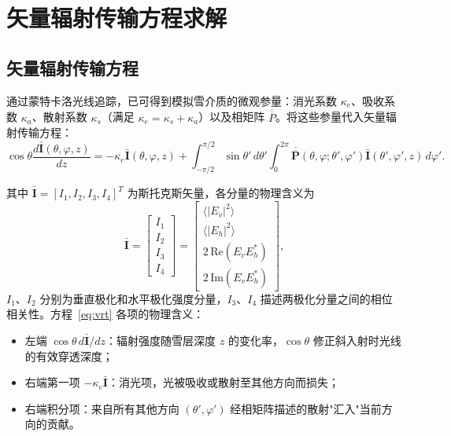 \documentclass[UTF8,a4paper,12pt]{ctexart}
\begin{document}
\section{矢量辐射传输方程求解}
\label{sec:vrt}

\subsection{矢量辐射传输方程}

通过蒙特卡洛光线追踪，已可得到模拟雪介质的微观参量：消光系数 $\kappa_e$、吸收系数 $\kappa_a$、散射系数 $\kappa_s$（满足 $\kappa_e=\kappa_s+\kappa_a$）以及相矩阵 $\overline{\overline{P}}$。将这些参量代入矢量辐射传输方程：
\begin{equation}
  \cos\theta\frac{d\bar{\mathbf{I}}(\theta,\varphi,z)}{dz}
  = -\kappa_e\bar{\mathbf{I}}(\theta,\varphi,z)
  + \int_{-\pi/2}^{\pi/2}\!\sin\theta'\,d\theta'
    \int_0^{2\pi}\!\overline{\overline{\mathbf{P}}}(\theta,\varphi;\theta',\varphi')
    \bar{\mathbf{I}}(\theta',\varphi',z)\,d\varphi'.
  \label{eq:vrt}
\end{equation}

其中 $\bar{\mathbf{I}}=[I_1,I_2,I_3,I_4]^T$ 为斯托克斯矢量，各分量的物理含义为
\begin{equation}
  \bar{\mathbf{I}} =
  \begin{bmatrix} I_1 \\ I_2 \\ I_3 \\ I_4 \end{bmatrix}
  =
  \begin{bmatrix}
    \langle|E_v|^2\rangle \\
    \langle|E_h|^2\rangle \\
    2\,\mathrm{Re}(E_v E_h^*) \\
    2\,\mathrm{Im}(E_v E_h^*)
  \end{bmatrix},
  \label{eq:stokes}
\end{equation}
$I_1$、$I_2$ 分别为垂直极化和水平极化强度分量，$I_3$、$I_4$ 描述两极化分量之间的相位相关性。方程~\eqref{eq:vrt} 各项的物理含义：
\begin{itemize}[leftmargin=2em]
  \item 左端 $\cos\theta\,d\bar{\mathbf{I}}/dz$：辐射强度随雪层深度 $z$ 的变化率，$\cos\theta$ 修正斜入射时光线的有效穿透深度；
  \item 右端第一项 $-\kappa_e\bar{\mathbf{I}}$：消光项，光被吸收或散射至其他方向而损失；
  \item 右端积分项：来自所有其他方向 $(\theta',\varphi')$ 经相矩阵描述的散射"汇入"当前方向的贡献。
\end{itemize}
\end{document}
